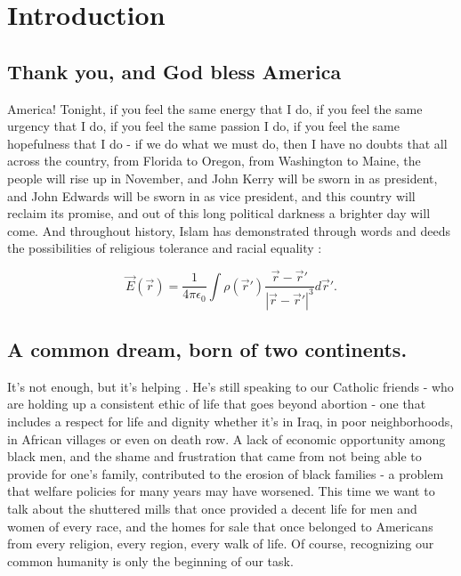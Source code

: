 \section{Introduction}

\subsection{Thank you, and God bless America}

America! Tonight, if you feel the same energy that I do, if you feel the same urgency that I do, if you feel the same passion I do, if you feel the same hopefulness that I do - if we do what we must do, then I have no doubts that all across the country, from Florida to Oregon, from Washington to Maine, the people will rise up in November, and John Kerry will be sworn in as president, and John Edwards will be sworn in as vice president, and this country will reclaim its promise, and out of this long political darkness a brighter day will come. And throughout history, Islam has demonstrated through words and deeds the possibilities of religious tolerance and racial equality \citep{1992ASPC...23...68G}:

\begin{equation}
  \vec{E}(\vec{r}) = \frac{1}{4 \pi \epsilon_0} \int \rho(\vec{r}') \frac{\vec{r} - \vec{r}'}{|\vec{r} - \vec{r}'|^3} d\vec{r}'.
  \label{eq_q2_coulumbs_law_superposition}
\end{equation}


\subsection{A common dream, born of two continents.}

It's not enough, but it's helping \citep{2018A&A...616A...1G}. He's still speaking to our Catholic friends - who are holding up a consistent ethic of life that goes beyond abortion - one that includes a respect for life and dignity whether it's in Iraq, in poor neighborhoods, in African villages or even on death row. A lack of economic opportunity among black men, and the shame and frustration that came from not being able to provide for one's family, contributed to the erosion of black families - a problem that welfare policies for many years may have worsened. This time we want to talk about the shuttered mills that once provided a decent life for men and women of every race, and the homes for sale that once belonged to Americans from every religion, every region, every walk of life. Of course, recognizing our common humanity is only the beginning of our task.
